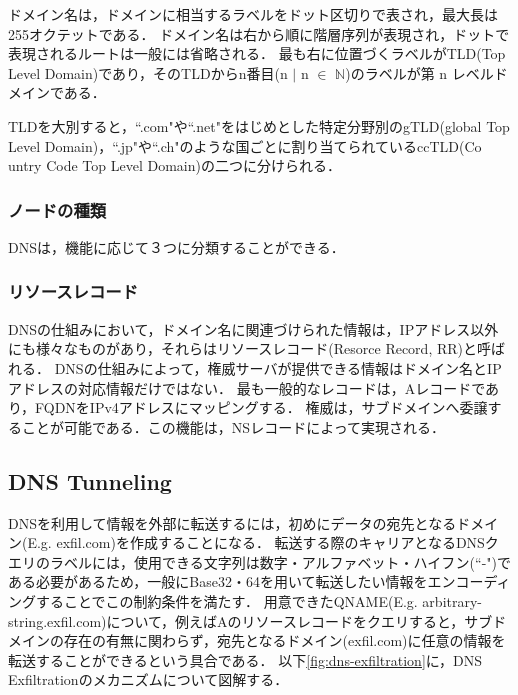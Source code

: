 ドメイン名は，ドメインに相当するラベルをドット区切りで表され，最大長は255オクテットである．
ドメイン名は右から順に階層序列が表現され，ドットで表現されるルートは一般には省略される．
最も右に位置づくラベルがTLD(Top Level Domain)であり，そのTLDからn番目(n $\mid$ n $\in$ $\mathbb{N}$)のラベルが第 n レベルドメインである．

TLDを大別すると，``.com"や``.net"をはじめとした特定分野別のgTLD(global Top Level Domain)，``.jp"や``.ch"のような国ごとに割り当てられているccTLD(Co\\untry Code Top Level Domain)の二つに分けられる．

\subsubsection{ノードの種類}
DNSは，機能に応じて３つに分類することができる．

\subsubsection{リソースレコード}
DNSの仕組みにおいて，ドメイン名に関連づけられた情報は，IPアドレス以外にも様々なものがあり，それらはリソースレコード(Resorce Record, RR)と呼ばれる．
DNSの仕組みによって，権威サーバが提供できる情報はドメイン名とIPアドレスの対応情報だけではない．
最も一般的なレコードは，Aレコードであり，FQDNをIPv4アドレスにマッピングする．
権威は，サブドメインへ委譲することが可能である．この機能は，NSレコードによって実現される．

\subsection{DNS Tunneling}
\label{sec:dns-tunnel}
DNSを利用して情報を外部に転送するには，初めにデータの宛先となるドメイン(E.g. exfil.com)を作成することになる．
転送する際のキャリアとなるDNSクエリのラベルには，使用できる文字列は数字・アルファベット・ハイフン(``-")である必要があるため，一般にBase32・64を用いて転送したい情報をエンコーディングすることでこの制約条件を満たす．
用意できたQNAME(E.g. arbitrary-string.exfil.com)について，例えばAのリソースレコードをクエリすると，サブドメインの存在の有無に関わらず，宛先となるドメイン(exfil.com)に任意の情報を転送することができるという具合である．
以下\ref{fig:dns-exfiltration}に，DNS Exfiltrationのメカニズムについて図解する．

